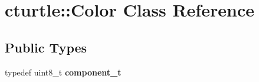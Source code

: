\hypertarget{classcturtle_1_1Color}{}\section{cturtle\+:\+:Color Class Reference}
\label{classcturtle_1_1Color}
\subsection*{Public Types}
\begin{DoxyCompactItemize}
\item 
\mbox{\label{classcturtle_1_1Color_af5d6a12b28777dd614f1c66a220b2aa6}} 
typedef uint8\+\_\+t {\bfseries component\+\_\+t}
\end{DoxyCompactItemize}
